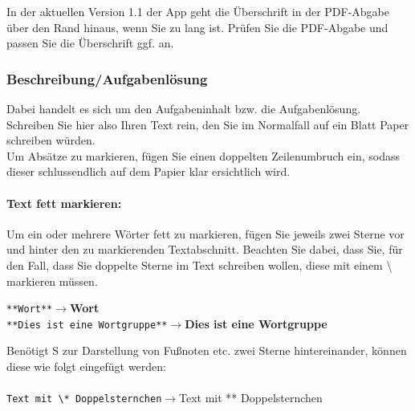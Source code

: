 \documentclass[]{article}
\begin{document}
	\begin{tcolorbox}[warning, title=Warnung: Versionsbedingte Fehler]
		 In der aktuellen Version 1.1 der App geht die Überschrift in der PDF-Abgabe über den Rand hinaus, wenn Sie zu lang ist. Prüfen Sie die PDF-Abgabe und passen Sie die Überschrift ggf. an.
	\end{tcolorbox}
	
	\subsubsection{Beschreibung/Aufgabenlösung}
	Dabei handelt es sich um den Aufgabeninhalt bzw. die Aufgabenlösung. Schreiben Sie hier also Ihren Text rein, den Sie im Normalfall auf ein Blatt Paper schreiben würden.\\
	Um Absätze zu markieren, fügen Sie einen doppelten Zeilenumbruch ein, sodass dieser schlussendlich auf dem Papier klar ersichtlich wird. 
	
	\paragraph{Text fett markieren:}
	Um ein oder mehrere Wörter fett zu markieren, fügen Sie jeweils zwei Sterne vor und hinter den zu markierenden Textabschnitt. Beachten Sie dabei, dass Sie, für den Fall, dass Sie doppelte Sterne im Text schreiben wollen, diese mit einem \textbackslash{} markieren müssen.
	
	\begin{tcolorbox}[example, title=Beispiel: Text fett markieren]
		\hspace*{15pt}\texttt{**Wort**}\hspace*{120pt}$\rightarrow$\hspace*{15pt}\textbf{Wort}\\
		\hspace*{15pt}\texttt{**Dies ist eine Wortgruppe**}\hspace*{15pt}$\rightarrow$\hspace*{15pt}\textbf{Dies ist eine Wortgruppe}\\

	\end{tcolorbox}
	
	\begin{tcolorbox}[antiexample, title=Gegenbeispiel: Zwei Sterne hintereinander einfügen]
		Benötigt S zur Darstellung von Fußnoten etc. zwei Sterne hintereinander, können diese wie folgt eingefügt werden:\\\\
				\hspace*{15pt}\texttt{Text mit \textbackslash** Doppelsternchen}\hspace*{15pt}$\rightarrow$\hspace*{15pt}Text mit ** Doppelsternchen\\
	\end{tcolorbox}
	
\end{document}
